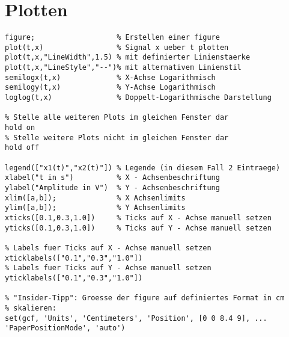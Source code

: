 \documentclass[threecolumn, german]{latex4ei/latex4ei_sheet}
\begin{document}
	\begin{minipage}{\linewidth}
	\section{Plotten}
	
	\begin{sectionbox}
		\begin{lstlisting}
figure;                   % Erstellen einer figure
plot(t,x)                 % Signal x ueber t plotten
plot(t,x,"LineWidth",1.5) % mit definierter Linienstaerke
plot(t,x,"LineStyle","--")% mit alternativem Linienstil
semilogx(t,x)             % X-Achse Logarithmisch
semilogy(t,x)             % Y-Achse Logarithmisch
loglog(t,x)               % Doppelt-Logarithmische Darstellung

% Stelle alle weiteren Plots im gleichen Fenster dar
hold on
% Stelle weitere Plots nicht im gleichen Fenster dar
hold off

legend(["x1(t)","x2(t)"]) % Legende (in diesem Fall 2 Eintraege)
xlabel("t in s")          % X - Achsenbeschriftung
ylabel("Amplitude in V")  % Y - Achsenbeschriftung
xlim([a,b]);              % X Achsenlimits
ylim([a,b]);              % Y Achsenlimits
xticks([0.1,0.3,1.0])     % Ticks auf X - Achse manuell setzen
yticks([0.1,0.3,1.0])     % Ticks auf Y - Achse manuell setzen

% Labels fuer Ticks auf X - Achse manuell setzen
xticklabels(["0.1","0.3","1.0"])
% Labels fuer Ticks auf Y - Achse manuell setzen
yticklabels(["0.1","0.3","1.0"])

% "Insider-Tipp": Groesse der figure auf definiertes Format in cm
% skalieren:
set(gcf, 'Units', 'Centimeters', 'Position', [0 0 8.4 9], ...
'PaperPositionMode', 'auto')
		\end{lstlisting}
	\end{sectionbox}
	\end{minipage}
	
\end{document}
